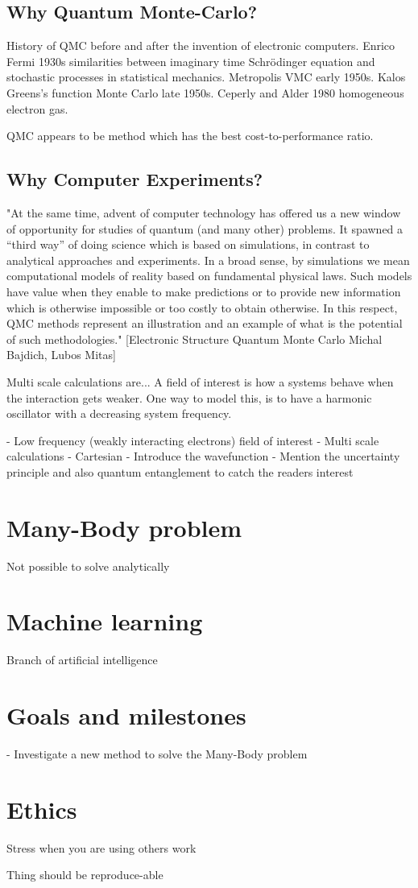 \subsection*{Why Quantum Monte-Carlo?}
History of QMC before and after the invention of electronic computers. Enrico Fermi 1930s similarities between imaginary time Schrödinger equation and stochastic processes in statistical mechanics. Metropolis VMC early 1950s. Kalos Greens's function Monte Carlo late 1950s. Ceperly and Alder 1980 homogeneous electron gas. 

QMC appears to be method which has the best cost-to-performance ratio.

\subsection{Why Computer Experiments?}
"At the same time, advent of computer technology has
offered us a new window of opportunity for studies of quantum (and many other) problems. It
spawned a “third way” of doing science which is based on simulations, in contrast to analytical
approaches and experiments. In a broad sense, by simulations we mean computational models of
reality based on fundamental physical laws. Such models have value when they enable to make
predictions or to provide new information which is otherwise impossible or too costly to obtain
otherwise. In this respect, QMC methods represent an illustration and an example of what is the
potential of such methodologies." [Electronic Structure Quantum Monte Carlo Michal Bajdich, Lubos Mitas]  

Multi scale calculations are... A field of interest is how a systems behave when the interaction gets weaker. One way to model this, is to have a harmonic oscillator with a decreasing system frequency. 

 - Low frequency (weakly interacting electrons) field of interest
 - Multi scale calculations
 - Cartesian
 - Introduce the wavefunction
 - Mention the uncertainty principle and also quantum entanglement to catch the readers interest
 
 
\section{Many-Body problem} \label{subsec:manybodyproblem}
Not possible to solve analytically

\section{Machine learning} \label{subsec:machinelearning}
Branch of artificial intelligence

\section{Goals and milestones} \label{subsec:goals}
- Investigate a new method to solve the Many-Body problem

\section{Ethics}
Stress when you are using others work

Thing should be reproduce-able
